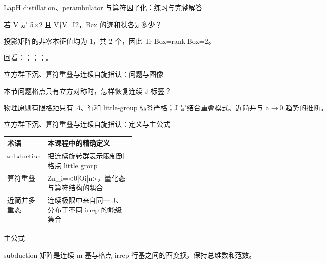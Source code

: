 \begin{frame}[t]{LapH distillation、perambulator 与算符因子化：练习与完整解答}
\footnotesize
\begin{block}{}若 V 是 5\ensuremath{\times}2 且 V†V=I2，Box 的迹和秩各是多少？\end{block}
\begin{exampleblock}{}投影矩阵的非零本征值均为 1，共 2 个，因此 Tr Box=rank Box=2。\end{exampleblock}
\vfill
\scriptsize 回看：；；；。
\end{frame}

\begin{frame}[t]{立方群下沉、算符重叠与连续自旋指认：问题与图像}
\footnotesize
\begin{block}{本节问题}格点只有立方对称时，怎样恢复连续 J 标签？\end{block}
\begin{block}{物理原则}\quad 有限格距只有 \ensuremath{\Lambda}、行和 little-group 标签严格；J 是结合重叠模式、近简并与 a\ensuremath{\rightarrow}0 趋势的推断。\end{block}
\end{frame}

\begin{frame}[t]{立方群下沉、算符重叠与连续自旋指认：定义与主公式}
\footnotesize\begin{tabularx}{\linewidth}{p{0.30\linewidth}Y}
\toprule 术语 & 本课程中的精确定义\\\midrule
{} subduction & 把连续旋转群表示限制到格点 little group\\
 算符重叠 & Zn\_i=<0|Oi|n>，量化态与算符结构的耦合\\
 近简并多重态 & 连续极限中来自同一 J、分布于不同 irrep 的能级集合\\
\bottomrule\end{tabularx}\vspace{0.15cm}
\begin{block}{ 主公式}\centering{}\end{block}
subduction 矩阵是连续 m 基与格点 irrep 行基之间的酉变换，保持总维数和范数。
\end{frame}

